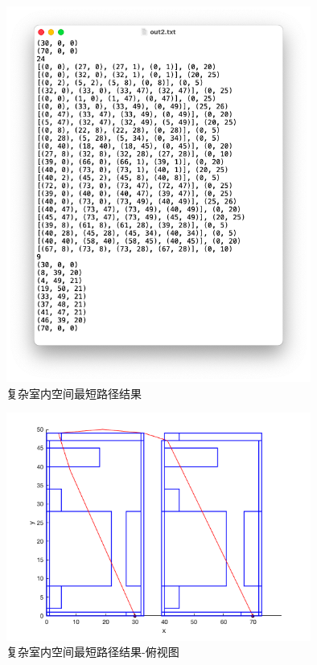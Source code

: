 \begin{figure}[htb]
    \centering
    \caption{复杂室内空间最短路径结果}
    \label{fig:test_complex_situation_out}
    \includegraphics[width=10cm]{figures/test_complex_situation_out.png}
\end{figure}
\begin{figure}[htb]
    \centering
    \caption{复杂室内空间最短路径结果-俯视图}
    \label{fig:test_complex_situation_out_top}
    \includegraphics[width=10cm]{figures/test_complex_situation_out_top.png}
\end{figure}
